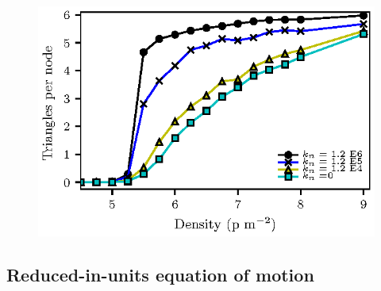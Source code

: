 \documentclass[preprint,12pt]{elsarticle}
\begin{document}
\begin{figure}[!htbp]
\centering
    \ 
    \\
\caption[width=0.47\columnwidth]{}
\label{network_corridor}
\end{figure}



\begin{figure}[htbp!]
\centering
\includegraphics[width=0.7\columnwidth]
{./triangles.eps}
\caption{\label{} }
\end{figure}




\subsection{\label{reduced-in-units} Reduced-in-units equation of motion}
\end{document}
